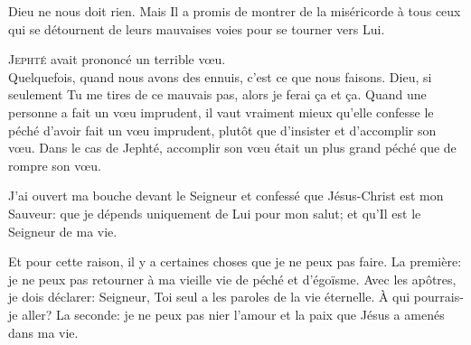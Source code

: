 Dieu ne nous doit rien. Mais Il a promis de montrer de la miséricorde
 à tous ceux qui se détournent de leurs mauvaises voies
 pour se tourner vers Lui. 

\dvrule







\lettrine{J}{ephté} avait prononcé un terrible v\oe{}u. \\[1ex]
Quelquefois, quand nous avons des ennuis, c'est ce que nous faisons.
 \Og Dieu, si seulement Tu me tires de ce mauvais pas,
 alors je ferai \c{c}a et \c{c}a. \Fg{}
 Quand une personne a fait un v\oe{}u imprudent,
 il vaut vraiment mieux qu'elle confesse le péché d'avoir fait un v\oe{}u imprudent,
 plutôt que d'insister et d'accomplir son v\oe{}u.
 Dans le cas de Jephté, accomplir son v\oe{}u était un plus grand péché
 que de rompre son v\oe{}u.


J'ai ouvert ma bouche devant le Seigneur et confessé que Jésus-Christ
 est mon Sauveur: que je dépends uniquement de Lui pour mon salut;
 et qu'Il est le Seigneur de ma vie.

Et pour cette raison, il y a certaines choses que je ne peux pas faire.
 La première: je ne peux pas retourner à ma vieille vie de péché et d'égoïsme.
 Avec les apôtres, je dois déclarer:
 \Og Seigneur, Toi seul a les paroles de la vie éternelle.
 \`A qui pourrais-je aller? \Fg{}
 La seconde: je ne peux pas nier l'amour et la paix que Jésus
 a amenés dans ma vie. 

